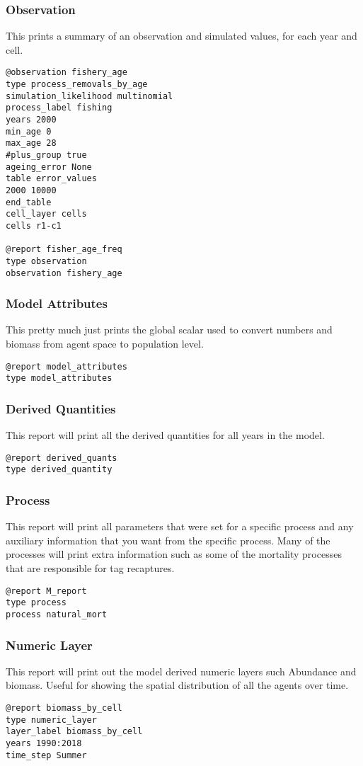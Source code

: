 \subsubsection{Observation}
This prints a summary of an observation and simulated values, for each year and cell.

{\small{\begin{verbatim}
@observation fishery_age
type process_removals_by_age
simulation_likelihood multinomial
process_label fishing
years 2000
min_age 0
max_age 28
#plus_group true
ageing_error None
table error_values
2000 10000
end_table
cell_layer cells
cells r1-c1	
		
@report fisher_age_freq
type observation
observation fishery_age
\end{verbatim}}}


\subsubsection{Model Attributes}
This pretty much just prints the global scalar used to convert numbers and biomass from agent space to population level.
{\small{\begin{verbatim}
@report model_attributes
type model_attributes
\end{verbatim}}}


\subsubsection{Derived Quantities}
This report will print all the derived quantities for all years in the model.
{\small{\begin{verbatim}
@report derived_quants
type derived_quantity
\end{verbatim}}}

\subsubsection{Process}
This report will print all parameters that were set for a specific process and any auxiliary information that you want from the specific process. Many of the processes will print extra information such as some of the mortality processes that are responsible for tag recaptures.
{\small{\begin{verbatim}
@report M_report
type process
process natural_mort
\end{verbatim}}}


\subsubsection{Numeric Layer}
This report will print out the model derived numeric layers such Abundance and biomass. Useful for showing the spatial distribution of all the agents over time.
{\small{\begin{verbatim}
@report biomass_by_cell
type numeric_layer
layer_label biomass_by_cell
years 1990:2018
time_step Summer
\end{verbatim}}}



